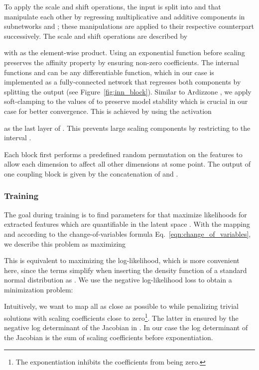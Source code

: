 \documentclass[10pt,twocolumn,letterpaper]{article}
\begin{document}
To apply the scale and shift operations, the input  is split into  and  that manipulate each other by regressing multiplicative and additive components in subnetworks  and ; these manipulations are applied to their respective counterpart successively.
The scale and shift operations are described by

with  as the element-wise product. 
Using an exponential function before scaling preserves the affinity property by ensuring non-zero coefficients.
The internal functions  and  can be any differentiable function, which in our case is implemented as a fully-connected network that regresses both components by splitting the output (see Figure~\ref{fig:inn_block}).
Similar to Ardizzone \etal \cite{cinn}, we apply soft-clamping to the values of  to preserve model stability which is crucial in our case for better convergence. 
This is achieved by using the activation

as the last layer of .
This prevents large scaling components by restricting  to the interval .

Each block first performs a predefined random permutation on the features to allow each dimension to affect all other dimensions at some point.
The output of one coupling block is given by the concatenation of  and .


\subsubsection{Training}
\label{Training}
The goal during training is to find parameters for  that maximize likelihoods for extracted features  which are quantifiable in the latent space . With the mapping  and according to the change-of-variables formula Eq.~\ref{eqn:change_of_variables}, we describe this problem as maximizing

This is equivalent to maximizing the log-likelihood, which is more convenient here, since the terms simplify when inserting the density function of a standard normal distribution as . We use the negative log-likelihood loss  to obtain a minimization problem:

Intuitively, we want  to map all  as close as possible to  while penalizing trivial solutions with scaling coefficients close to zero\footnote{The exponentiation inhibits the coefficients from being zero.}.
The latter in ensured by the negative log determinant of the Jacobian  in .
In our case the log determinant of the Jacobian is the sum of scaling coefficients before exponentiation. 
\end{document}
